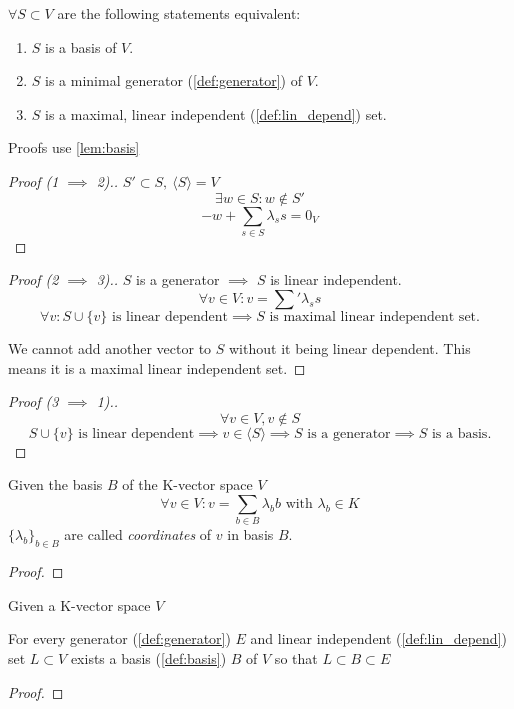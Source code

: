 \begin{theorem}[Basis = Generator = \(S \subset V\)]
   \(\forall S \subset V\) are the following statements equivalent:
   \begin{enumerate}
      \item \(S\) is a basis of \(V\).
      \item \(S\) is a minimal generator (\ref{def:generator}) of \(V\).
      \item \(S\) is a maximal, linear independent (\ref{def:lin_depend}) set.
   \end{enumerate}
\end{theorem}
\begin{remark}
   Proofs use \cref{lem:basis}
\end{remark}
\begin{proof}[Proof (1 \(\implies\) 2).]
   \(S' \subset S,~\langle S\rangle = V\)
   \[\exists w \in S: w \notin S'\]
   \[-w + \sum_{s \in S} \lambda_s s = 0_V\]
\end{proof}
\begin{proof}[Proof (2 \(\implies\) 3).]
   \(S\) is a generator \(\implies\) \(S\) is linear independent.
   \[\forall v \in V: v = \sum' \lambda_s s\]
   \[\forall v: S \cup \{v\} \text{ is linear dependent} \implies S \text{ is maximal linear independent set.}\]

   We cannot add another vector to \(S\) without it being linear dependent.
   This means it is a maximal linear independent set.
\end{proof}
\begin{proof}[Proof (3 \(\implies\) 1).]
   \[\forall v \in V, v \notin S\]
   \[S \cup \{v\} \text{ is linear dependent} \implies v \in \langle S\rangle \implies S \text{ is a generator} \implies S \text{ is a basis.}\]
\end{proof}

\begin{corollary}[Coordinates]
   Given the basis \(B\) of the K-vector space \(V\)
   \[\forall v \in V: v = \sum_{b \in B} \lambda_b b \text{ with } \lambda_b \in K\]
   \(\{\lambda_b\}_{b \in B}\) are called \textit{coordinates} of \(v\) in basis \(B\).
\end{corollary}
\begin{proof}
\end{proof}

\begin{theorem}
   Given a K-vector space \(V\)

   For every generator (\ref{def:generator}) \(E\) and linear independent (\ref{def:lin_depend}) set \(L \subset V\) exists a basis (\ref{def:basis}) \(B\) of \(V\) so that \(L \subset B \subset E\)
\end{theorem}
\begin{proof}
\end{proof}


